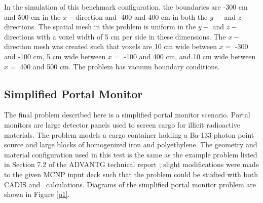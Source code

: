In the simulation of this benchmark configuration, the boundaries are -300 cm and 500
cm in the $x-$direction and -400 and 400 cm in both the $y-$ and $z-$directions.
The spatial mesh in this problem is uniform in the $y-$ and $z-$directions with a 
voxel width of 5 cm per side in these dimensions. The $x-$direction mesh was 
created such that voxels are 10 cm wide between $x =$ -300 and -100 cm, 5 cm wide 
between $x =$ -100 and 400 cm, and 10 cm wide between $x =$ 400 and 500 cm. The problem
has vacuum boundary conditions.

\FloatBarrier
\subsection{Simplified Portal Monitor}

The final problem described here is a simplified portal monitor scenario. Portal
monitors are large detector panels used to screen cargo for illicit radioactive
materials. The problem models a cargo container holding a Ba-133 photon point source
and large blocks of homogenized iron and polyethylene. 
The geometry and material configuration used in this test is the same as the
example problem listed in Section 7.2 of the ADVANTG technical report \cite{advantg};
slight modifications were made to the given MCNP input deck such that the problem 
could be studied with both CADIS and \fwc\ calculations. Diagrams of the simplified 
portal monitor problem are shown in Figure \ref{p1}.

